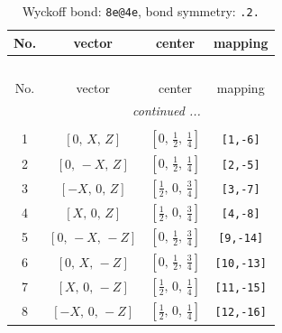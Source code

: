 \documentclass[fleqn,8pt]{jsarticle}
\begin{document}
\begin{longtable}{cccc}
\caption{Wyckoff bond: {\tt 8e@4e}, bond symmetry: {\tt .2.}}
 \\
 \hline \hline
No. & vector & center & mapping \\ \hline \endfirsthead

\multicolumn{3}{l}{\tablename\ \thetable{}} \\
 \hline \hline
No. & vector & center & mapping \\ \hline \endhead

 \hline \hline
\multicolumn{3}{r}{\footnotesize\it continued ...} \\ \endfoot

 \hline \hline
\multicolumn{3}{r}{} \\ \endlastfoot

1 & $\left[ 0,\, X,\, Z \right]$ & $\left[ 0,\, \frac{1}{2},\, \frac{1}{4} \right]$ & {\tt [1,-6]} \\ \hline
2 & $\left[ 0,\, - X,\, Z \right]$ & $\left[ 0,\, \frac{1}{2},\, \frac{1}{4} \right]$ & {\tt [2,-5]} \\ \hline
3 & $\left[ - X,\, 0,\, Z \right]$ & $\left[ \frac{1}{2},\, 0,\, \frac{3}{4} \right]$ & {\tt [3,-7]} \\ \hline
4 & $\left[ X,\, 0,\, Z \right]$ & $\left[ \frac{1}{2},\, 0,\, \frac{3}{4} \right]$ & {\tt [4,-8]} \\ \hline
5 & $\left[ 0,\, - X,\, - Z \right]$ & $\left[ 0,\, \frac{1}{2},\, \frac{3}{4} \right]$ & {\tt [9,-14]} \\ \hline
6 & $\left[ 0,\, X,\, - Z \right]$ & $\left[ 0,\, \frac{1}{2},\, \frac{3}{4} \right]$ & {\tt [10,-13]} \\ \hline
7 & $\left[ X,\, 0,\, - Z \right]$ & $\left[ \frac{1}{2},\, 0,\, \frac{1}{4} \right]$ & {\tt [11,-15]} \\ \hline
8 & $\left[ - X,\, 0,\, - Z \right]$ & $\left[ \frac{1}{2},\, 0,\, \frac{1}{4} \right]$ & {\tt [12,-16]} \\
\end{longtable}
\renewcommand{\arraystretch}{1.2}
\end{document}
